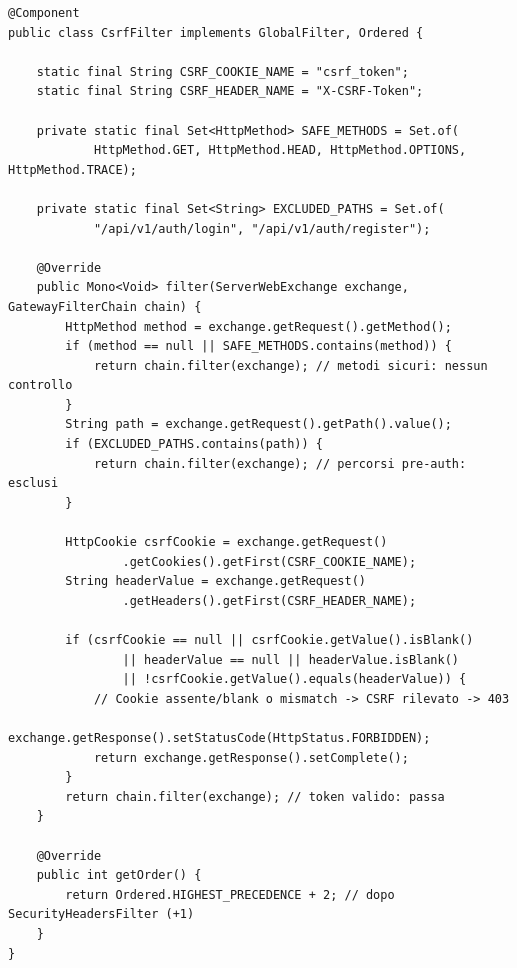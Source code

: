 ﻿\documentclass[a4paper,12pt]{report}
\begin{document}
\begin{securebox}[title={Codice Sicuro --- CsrfFilter.java (api-gateway)}]
\begin{lstlisting}[style=java]
@Component
public class CsrfFilter implements GlobalFilter, Ordered {

    static final String CSRF_COOKIE_NAME = "csrf_token";
    static final String CSRF_HEADER_NAME = "X-CSRF-Token";

    private static final Set<HttpMethod> SAFE_METHODS = Set.of(
            HttpMethod.GET, HttpMethod.HEAD, HttpMethod.OPTIONS, HttpMethod.TRACE);

    private static final Set<String> EXCLUDED_PATHS = Set.of(
            "/api/v1/auth/login", "/api/v1/auth/register");

    @Override
    public Mono<Void> filter(ServerWebExchange exchange, GatewayFilterChain chain) {
        HttpMethod method = exchange.getRequest().getMethod();
        if (method == null || SAFE_METHODS.contains(method)) {
            return chain.filter(exchange); // metodi sicuri: nessun controllo
        }
        String path = exchange.getRequest().getPath().value();
        if (EXCLUDED_PATHS.contains(path)) {
            return chain.filter(exchange); // percorsi pre-auth: esclusi
        }

        HttpCookie csrfCookie = exchange.getRequest()
                .getCookies().getFirst(CSRF_COOKIE_NAME);
        String headerValue = exchange.getRequest()
                .getHeaders().getFirst(CSRF_HEADER_NAME);

        if (csrfCookie == null || csrfCookie.getValue().isBlank()
                || headerValue == null || headerValue.isBlank()
                || !csrfCookie.getValue().equals(headerValue)) {
            // Cookie assente/blank o mismatch -> CSRF rilevato -> 403
            exchange.getResponse().setStatusCode(HttpStatus.FORBIDDEN);
            return exchange.getResponse().setComplete();
        }
        return chain.filter(exchange); // token valido: passa
    }

    @Override
    public int getOrder() {
        return Ordered.HIGHEST_PRECEDENCE + 2; // dopo SecurityHeadersFilter (+1)
    }
}
\end{lstlisting}
\end{securebox}
\end{document}
